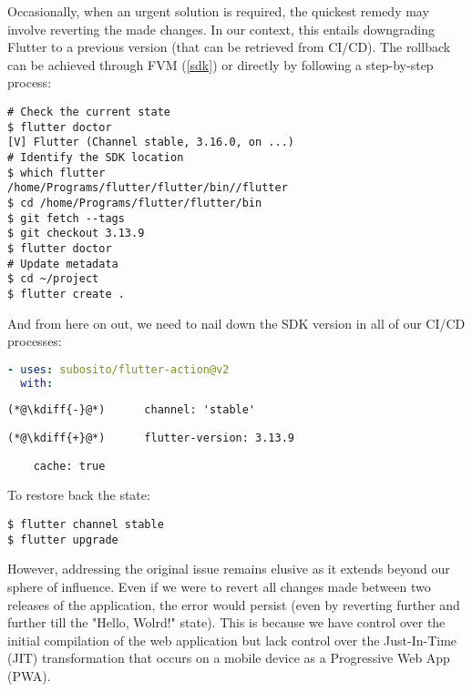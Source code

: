 Occasionally, when an urgent solution is required, the quickest remedy may involve reverting  the made 
changes. In our context, this entails downgrading Flutter to a previous version (that can be retrieved from CI/CD). 
The rollback can be achieved through FVM (\ref{sdk}) or directly by following a step-by-step process:

\begin{lstlisting}[language=terminal]
# Check the current state
$ flutter doctor
[V] Flutter (Channel stable, 3.16.0, on ...)
# Identify the SDK location
$ which flutter
/home/Programs/flutter/flutter/bin//flutter
$ cd /home/Programs/flutter/flutter/bin
$ git fetch --tags
$ git checkout 3.13.9
$ flutter doctor
# Update metadata
$ cd ~/project
$ flutter create .
\end{lstlisting}

\noindent And from here on out, we need to nail down the SDK version in all of our CI/CD processes:

\begin{lstlisting}[language=yaml]
- uses: subosito/flutter-action@v2
  with:
\end{lstlisting}
{
\xpretocmd{\lstlisting}{\vspace{-12pt}}{}{}
\begin{lstlisting}[firstnumber=2, backgroundcolor=\color{backred}]
(*@\kdiff{-}@*)      channel: 'stable'
\end{lstlisting}
\begin{lstlisting}[firstnumber=2, backgroundcolor=\color{backgreen}]
(*@\kdiff{+}@*)      flutter-version: 3.13.9
\end{lstlisting}
\begin{lstlisting}
    cache: true
\end{lstlisting}
}

\noindent To restore back the state:

\begin{lstlisting}[language=terminal]
$ flutter channel stable
$ flutter upgrade
\end{lstlisting}

\noindent However, addressing the original issue remains elusive as it extends beyond our sphere of influence. Even if 
we were to revert all changes made between two releases of the application, the error would persist (even by reverting 
further and further till the "Hello, Wolrd!" state). This is because we have control over the initial compilation of the 
web application but lack control over the Just-In-Time (JIT) transformation that occurs on a mobile device as a 
Progressive Web App (PWA).

